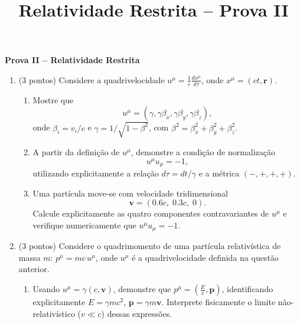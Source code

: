 \newif\ifuseseminar
\useseminartrue


\title{Relatividade Restrita -- Prova II}


\begin{center}
    \textbf{\Large Prova II -- Relatividade Restrita}
\end{center}
\begin{enumerate}
    \item (3 pontos) Considere a quadrivelocidade
          $u^\mu=\frac{1}{c}\frac{dx^\mu}{d\tau}$, onde $x^\mu = (ct, \mathbf r)$.
          \begin{enumerate}
              \item Mostre que
                    $$
                        u^\mu=(\gamma,\gamma\beta_x,\gamma\beta_y,\gamma\beta_z),
                    $$
                    onde $\beta_i=v_i/c$ e $\gamma=1/\sqrt{1-\beta^2}$, com $\beta^2 = \beta_x^2+\beta_y^2+\beta_z^2$.

              \item A partir da definição de $u^\mu$, demonstre a condição de normalização
                    $$
                        u^\mu u_\mu=-1,
                    $$
                    utilizando explicitamente a relação $d\tau = dt/\gamma$ e a métrica
                    $(-,+,+,+)$.

              \item Uma partícula move-se com velocidade tridimensional
                    $$
                        \mathbf v=(0.6c,\;0.3c,\;0).
                    $$
                    Calcule explicitamente as quatro componentes contravariantes de
                    $u^\mu$ e verifique numericamente que $u^\mu u_\mu = -1$.
          \end{enumerate}

    \item (3 pontos) Considere o quadrimomento de uma partícula relativística de massa
          $m$: $p^\mu = m c \, u^\mu$, onde $u^\mu$ é a quadrivelocidade definida na
          questão anterior.

          \begin{enumerate}
              \item Usando $u^\mu = \gamma(c, \mathbf v)$, demonstre que $p^\mu =
                        \left( \frac{E}{c}, \mathbf p \right)$, identificando
                    explicitamente $E = \gamma m c^2$, $\mathbf p = \gamma m
                        \mathbf v$. Interprete fisicamente o limite não-relativístico
                    ($v \ll c$) dessas expressões.


\end{enumerate}
\end{enumerate}
